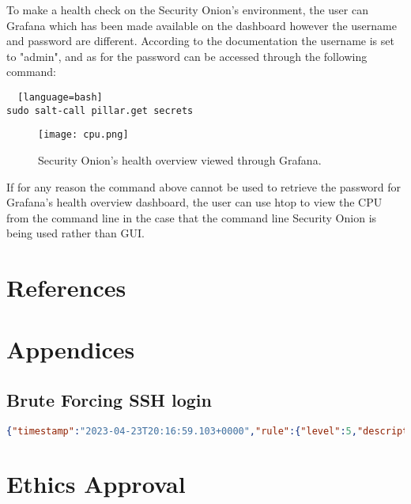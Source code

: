 \documentclass[12pt]{article}
\begin{document}
To make a health check on the Security Onion's environment, the user can Grafana which has been made available on the dashboard however the username and password are different. According to the documentation the username is set to "admin", and as for the password can be accessed through the following command:
\begin{lstlisting}  [language=bash]
sudo salt-call pillar.get secrets 
\end{lstlisting}


\begin{center}
\begin{figure}[H]
\centering
\texttt{[image: cpu.png]}
\caption{Security Onion's health overview viewed through Grafana. } 
\label{fig:attack1}
\end{figure}
\end{center}

If for any reason the command above cannot be used to retrieve the password for Grafana's health overview dashboard, the user can use htop to view the CPU from the command line in the case that the command line Security Onion is being used rather than GUI.






	\section{References }
	
	\renewcommand{\bibsection}{}
	
	
 
	
	
		\section{Appendices}
	\subsection{Brute Forcing SSH login}
	\begin{lstlisting}[language=json,firstnumber=1]	
		{"timestamp":"2023-04-23T20:16:59.103+0000","rule":{"level":5,"description":"sshd: authentication failed.","id":"5716","mitre":{"id":["T1110"],"tactic":["Credential Access"],"technique":["Brute Force"]},"firedtimes":3,"mail":false,"groups":["syslog","sshd","authentication_failed"],"pci_dss":["10.2.4","10.2.5"],"gpg13":["7.1"],"gdpr":["IV_35.7.d","IV_32.2"],"hipaa":["164.312.b"],"nist_800_53":["AU.14","AC.7"],"tsc":["CC6.1","CC6.8","CC7.2","CC7.3"]},"agent":{"id":"001","name":"securityonion","ip":"10.0.2.0"},"manager":{"name":"securityonion-wazuh-manager"},"id":"1682281019.25850","full_log":"Apr 23 20:16:59 securityonion sshd[29364]: Failed password for silvia from 10.0.2.20 port 50528 ssh2","predecoder":{"program_name":"sshd","timestamp":"Apr 23 20:16:59","hostname":"securityonion"},"decoder":{"parent":"sshd","name":"sshd"},"data":{"srcip":"10.0.2.20","srcport":"50528","dstuser":"silvia"},"location":"/var/log/secure"}
	\end{lstlisting}
	
	\section{Ethics Approval}
	
\end{document}
